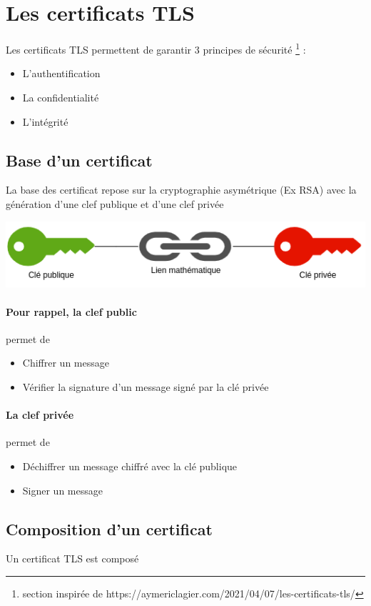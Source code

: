 \documentclass[french, 12pt]{article}%
\newcommand{\itemE}{\item[$\bullet$]}
\begin{document}
\section{Les certificats TLS}
Les certificats TLS permettent de garantir 3 principes de sécurité \footnote{section inspirée de https://aymericlagier.com/2021/04/07/les-certificats-tls/} : 
\begin{itemize}
\itemE L'authentification
\itemE La confidentialité
\itemE L'intégrité
\end{itemize}

\subsection{Base d'un certificat}

La base des certificat repose sur la cryptographie asymétrique (Ex RSA) avec la génération d'une clef publique et d'une clef privée

\begin{center}
\includegraphics[scale=0.5]{./ressource/clefPubliquePrive}
\end{center}

 
\paragraph{Pour rappel, la clef public} permet de 
\begin{itemize}
\itemE Chiffrer un message
\itemE Vérifier la signature d’un message signé par la clé privée
\end{itemize}

\paragraph{La clef privée} permet de 
\begin{itemize}
\itemE Déchiffrer un message chiffré avec la clé publique
\itemE Signer un message
\end{itemize}

\subsection{Composition d'un certificat}
Un certificat TLS est composé 
\end{document}
